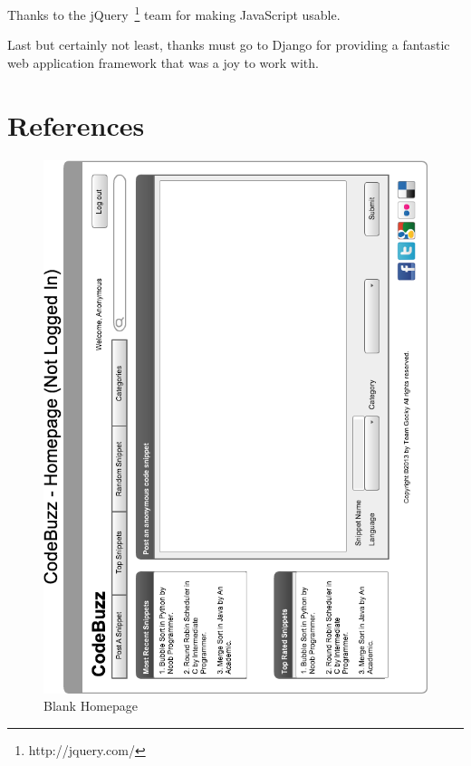 \documentclass{sig-alt-release2}
\begin{document}
Thanks to the jQuery~\footnote{http://jquery.com/} team for making
JavaScript usable.

Last but certainly not least, thanks must go to Django for providing
a fantastic web application framework that was a joy to work with.
\section{References}

\begin{figure}
\includegraphics[width=\textwidth]{../imgs/InitialHomepageHorz.png}
\caption{Blank Homepage}
\label{fig:blankPage}
\end{figure}
\end{document}
